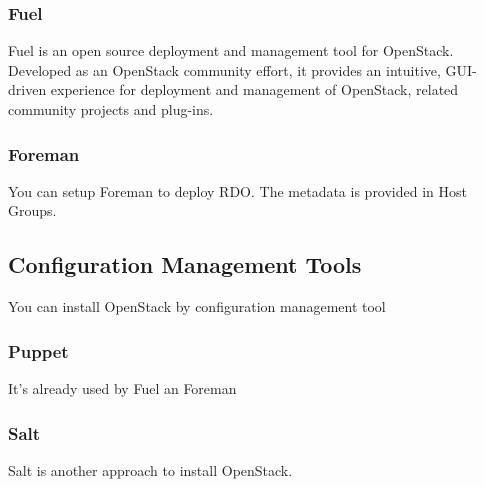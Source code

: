 \subsubsection{Fuel}

Fuel is an open source deployment and management tool for OpenStack. Developed as an OpenStack community effort, it provides an intuitive, GUI-driven experience for deployment and management of OpenStack, related community projects and plug-ins. 


\subsubsection{Foreman}

You can setup Foreman to deploy RDO. The metadata is provided in Host Groups.


\subsection{Configuration Management Tools}

You can install OpenStack by configuration management tool

\subsubsection{Puppet}

It's already used by Fuel an Foreman

\subsubsection{Salt}

Salt is another approach to install OpenStack.
